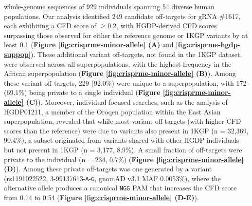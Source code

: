 \documentclass[a4paper, titlepage, openright]{book}
\begin{document}
whole-genome sequences of 929 individuals spanning 54 diverse human populations. Our analysis identified 249 candidate off-targets for gRNA \#1617, each exhibiting a CFD score of $\geq 0.2$, with HGDP-derived CFD scores surpassing those observed for either the reference genome or 1KGP variants by at least 0.1 (\textbf{Figure \ref{fig:crisprme-minor-allele} (A)} and \textbf{\ref{fig:crisprme-hgdp-suppop}}). These additional variant off-targets, not found in the 1KGP dataset, were observed across all superpopulations, with the highest frequency in the African superpopulation (\textbf{Figure \ref{fig:crisprme-minor-allele} (B)}). Among these variant off-targets, 229 (92.0\%) were unique to a superpopulation, with 172 (69.1\%) being private to a single individual (\textbf{Figure \ref{fig:crisprme-minor-allele} (C)}). Moreover, individual-focused searches, such as the analysis of HGDP01211, a member of the Oroqen population within the East Asian superpopulation, revealed that while most variant off-targets (with higher CFD scores than the reference) were due to variants also present in 1KGP (n = 32,369, 90.4\%), a subset originated from variants shared with other HGDP individuals but not present in 1KGP (n = 3,177, 8.9\%). A small fraction of off-targets were private to the individual (n = 234, 0.7\%) (\textbf{Figure \ref{fig:crisprme-minor-allele} (D)}). Among these private off-targets was one generated by a variant (rs1191022522, 3-99137613-\texttt{A}-\texttt{G}, gnomAD v3.1 MAF 0.0053\%), where the alternative allele produces a canonical \texttt{NGG} PAM that increases the CFD score from 0.14 to 0.54 (\textbf{Figure \ref{fig:crisprme-minor-allele} (D-E)}).
%
\end{document}
